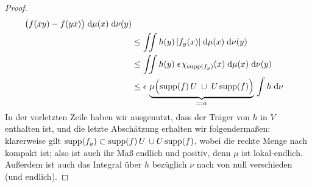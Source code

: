 \begin{proof}
\begin{align*}
{            \bigl( f(xy) - f(yx) \bigr) \dif{\mu(x)} \dif{\nu(y)} }         \\
        &\leq \iint h(y) \, \abs{f_y(x)} \dif{\mu(x)} \dif{\nu(y)}          \\
        &\leq \iint h(y) \;\epsilon\mkern2mu\chi_{\supp(f_y)}(x)            %
                \dif{\mu(x)} \dif{\nu(y)}                                   \\
        &\leq \epsilon \,                                                   %
            \underbrace{ \mu\Bigl( \supp(f)\,U \;\cup\; U\supp(f)           %
            \Bigr) }_{ \eqdef \alpha }                                      %
            \, \int h \dif\nu                                               %
    \end{align*}
    In der vorletzten Zeile haben wir ausgenutzt, dass der Träger von $h$ in $V$
    enthalten ist, und die letzte Abschätzung erhalten wir folgendermaßen:
    klarerweise gilt $\operatorname{supp}(f_y) \subset \operatorname{supp}(f)\,U \,\cup U\operatorname{supp}(f)$, wobei die
    rechte Menge nach  kompakt ist; also ist
    auch ihr Maß endlich und positiv, denn $\mu$ ist lokal-endlich. Außerdem ist
    auch das Integral über $h$ bezüglich $\nu$ nach 
    von null verschieden (und endlich).
    

\end{proof}
